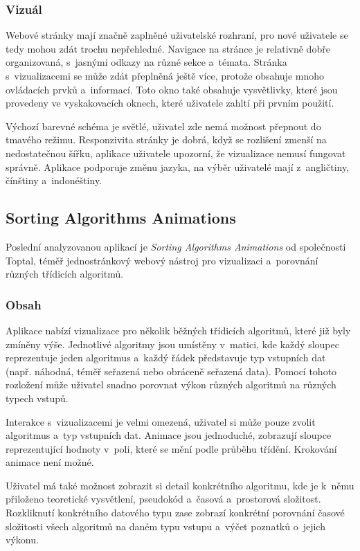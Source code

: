 \subsubsection*{Vizuál}

Webové stránky mají značně zaplněné uživatelské rozhraní, pro nové uživatele se tedy mohou zdát trochu nepřehledné.
Navigace na stránce je relativně dobře organizovaná, s~jasnými odkazy na různé sekce a~témata.
Stránka s~vizualizacemi se může zdát přeplněná ještě více, protože obsahuje mnoho ovládacích prvků a~informací.
Toto okno také obsahuje vysvětlivky, které jsou provedeny ve vyskakovacích oknech, které uživatele zahltí při prvním použití.

Výchozí barevné schéma je světlé, uživatel zde nemá možnost přepnout do tmavého režimu.
Responzivita stránky je dobrá, když se rozlišení zmenší na nedostatečnou šířku, aplikace uživatele upozorní, že vizualizace nemusí fungovat správně.
Aplikace podporuje změnu jazyka, na výběr uživatelé mají z~angličtiny, čínštiny a~indonéštiny.

\subsection{Sorting Algorithms Animations}
\label{subsec:other_apps_sa_toptal}

Poslední analyzovanou aplikací je \textit{Sorting Algorithms Animations} od společnosti Toptal, téměř jednostránkový webový nástroj pro vizualizaci a~porovnání různých třídicích algoritmů.~\cite{toptalSorting}

\subsubsection*{Obsah}

Aplikace nabízí vizualizace pro několik běžných třídicích algoritmů, které již byly zmíněny výše.
Jednotlivé algoritmy jsou umístěny v~matici, kde každý sloupec reprezentuje jeden algoritmus a~každý řádek představuje typ vstupních dat (např. náhodná, téměř seřazená nebo obráceně seřazená data).
Pomocí tohoto rozložení může uživatel snadno porovnat výkon různých algoritmů na různých typech vstupů.

Interakce s~vizualizacemi je velmi omezená, uživatel si může pouze zvolit algoritmus a~typ vstupních dat.
Animace jsou jednoduché, zobrazují sloupce reprezentující hodnoty v~poli, které se mění podle průběhu třídění.
Krokování animace není možné.

Uživatel má také možnost zobrazit si detail konkrétního algoritmu, kde je k~němu přiloženo teoretické vysvětlení, pseudokód a~časová a~prostorová složitost.
Rozkliknutí konkrétního datového typu zase zobrazí konkrétní porovnání časové složitosti všech algoritmů na daném typu vstupu a~výčet poznatků o~jejich výkonu.

